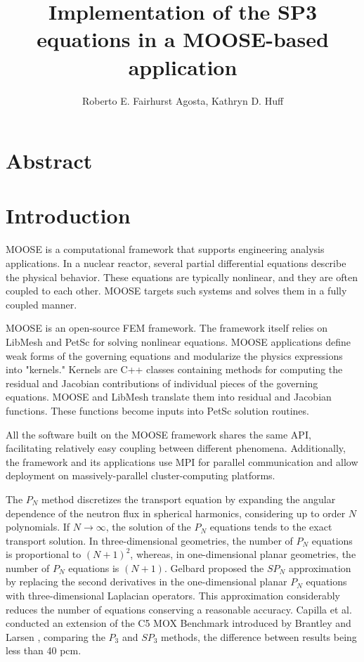 \documentclass{anstrans}
\title{Implementation of the SP3 equations in a MOOSE-based application}
\author{Roberto E. Fairhurst Agosta, Kathryn D. Huff}
\institute{
University of Illinois at Urbana-Champaign, Dept. of Nuclear, Plasma, and Radiological Engineering\\
ref3@illinois.edu
}
\begin{document}

\section{Abstract}



\section{Introduction}



MOOSE\cite{gaston_moose_2009} is a computational framework that supports engineering analysis applications.
In a nuclear reactor, several partial differential equations describe the physical behavior.
These equations are typically nonlinear, and they are often coupled to each other.
MOOSE targets such systems and solves them in a fully coupled manner.

MOOSE is an open-source \gls{FEM} framework.
The framework itself relies on LibMesh\cite{kirk_libmesh_2006} and PetSc\cite{balay_petsc_2016} for solving nonlinear equations.
MOOSE applications define weak forms of the governing equations and modularize the physics expressions into "kernels."
Kernels are C++ classes containing methods for computing the residual and Jacobian contributions of individual pieces of the governing equations.
MOOSE and LibMesh translate them into residual and Jacobian functions.
These functions become inputs into PetSc solution routines.

All the software built on the MOOSE framework shares the same \gls{API}, facilitating relatively easy coupling between different phenomena.
Additionally, the framework and its applications use \gls{MPI} for parallel communication and allow deployment on massively-parallel cluster-computing platforms.



The $P_N$ method \cite{davidson_neutron_1957} discretizes the transport equation by expanding the angular dependence of the neutron flux in spherical harmonics, considering up to order $N$ polynomials.
If $N \rightarrow \infty$, the solution of the $P_N$ equations tends to the exact transport solution.
In three-dimensional geometries, the number of $P_N$ equations is proportional to $(N+1)^2$, whereas, in one-dimensional planar geometries, the number of $P_N$ equations is $(N+1)$.
Gelbard \cite{gelbard_spherical_1960} proposed the $SP_N$ approximation by replacing the second derivatives in the one-dimensional planar $P_N$ equations with three-dimensional Laplacian operators.
This approximation considerably reduces the number of equations conserving a reasonable accuracy.
Capilla et al. \cite{capilla_applications_2009} conducted an extension of the C5 MOX Benchmark introduced by Brantley and Larsen \cite{brantley_simplifiedP3_2000}, comparing the $P_3$ and $SP_3$ methods, the difference between results being less than 40 pcm.
\end{document}
